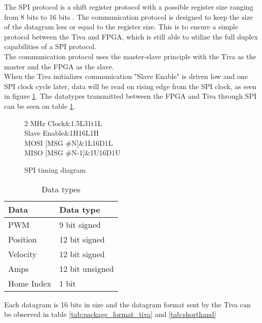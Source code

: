 \documentclass[../../../main]{subfiles}
\begin{document}
The SPI protocol is a shift register protocol with a possible register size ranging from 8 bits to 16 bits \cite[sec.15]{tiva_data}.
The communication protocol is designed to keep the size of the datagram less or equal to the register size. This is to ensure a simple protocol between the Tiva and FPGA, which is still able to utilize the full duplex capabilities of a SPI protocol. \\
The communication protocol uses the master-slave principle with the Tiva as the master and the FPGA as the slave.\\
When the Tiva initializes communication "Slave Enable" is driven low and one SPI clock cycle later,
data will be read on rising edge from the SPI clock, as seen in figure \ref{fig:spi_timing_diagram}. The datatypes transmitted between the FPGA and Tiva through SPI can be seen on table \ref{tab:spi_datatypes}.
\\

\begin{figure}[h]
	\center
\begin{tikztimingtable}[timing/font=\normalfont]
	{2 MHz Clock}&1.5L31{t}1L\\
	{Slave Enable}&1H16L1H\\
	{MOSI [MSG \#N]}&1L16{D{}}1L\\
	{MISO [MSG \#N-1]}&1U16{D{}}1U\\
\end{tikztimingtable}
\caption{SPI timing diagram}
\label{fig:spi_timing_diagram}
\end{figure}

\begin{table}[h]
	\centering
	\begin{tabular}{ll}
		\textbf{Data}& \textbf{Data type}  \\
		\hline
		PWM& 9 bit signed \\
		Position& 12 bit signed \\
		Velocity& 12 bit signed \\
		Amps& 12 bit unsigned \\
		Home Index& 1 bit
	\end{tabular}
	\caption{Data types}
	\label{tab:spi_datatypes}
\end{table}

Each datagram is 16 bits in size and the datagram format sent by the Tiva
can be observed in table \ref{tab:package_format_tiva} and \ref{tab:shorthand}
\end{document}
